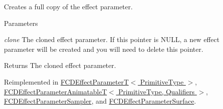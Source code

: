\label{classFCDEffectParameter_a75abe4b8964493db40604fa3d0e373eb}
Creates a full copy of the effect parameter. 
\begin{DoxyParams}{Parameters}
\item[{\em clone}]The cloned effect parameter. If this pointer is NULL, a new effect parameter will be created and you will need to delete this pointer. \end{DoxyParams}
\begin{DoxyReturn}{Returns}
The cloned effect parameter. 
\end{DoxyReturn}


Reimplemented in \hyperlink{classFCDEffectParameterT_a2db377c408f4ab9fec8795aa91d3b77e}{FCDEffectParameterT$<$ PrimitiveType $>$}, \hyperlink{classFCDEffectParameterAnimatableT_a810e39c7a3824cf55828197ce0befa79}{FCDEffectParameterAnimatableT$<$ PrimitiveType, Qualifiers $>$}, \hyperlink{classFCDEffectParameterSampler_af72a0f9e9514fca46bc9996ed872eb01}{FCDEffectParameterSampler}, and \hyperlink{classFCDEffectParameterSurface_a0b95f01b907cb82af8cb84106d227cf3}{FCDEffectParameterSurface}.

